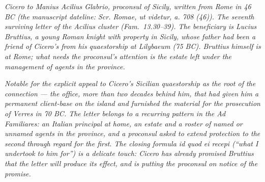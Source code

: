 
\textit{Cicero to Manius Acilius Glabrio, proconsul of
Sicily, written from Rome in 46 BC (the manuscript
dateline: \textit{Scr. Romae, ut videtur, a. 708 (46)}).
The seventh surviving letter of the Acilius cluster
(Fam.\ 13.30--39). The beneficiary is Lucius Bruttius, a
young Roman knight with property in Sicily, whose
father had been a friend of Cicero's from his
quaestorship at Lilybaeum (75 BC). Bruttius himself is
at Rome; what needs the proconsul's attention is the
estate left under the management of agents in the
province.}

\textit{Notable for the explicit appeal to Cicero's
Sicilian quaestorship as the root of the connection ---
the office, more than two decades behind him, that had
given him a permanent client-base on the island and
furnished the material for the prosecution of Verres in
70 BC. The letter belongs to a recurring pattern in the
\textit{Ad Familiares}: an Italian principal at home, an
estate and a roster of named or unnamed agents in the
province, and a proconsul asked to extend protection to
the second through regard for the first. The closing
formula \textit{id quod ei recepi} (``what I undertook
to him for'') is a delicate touch: Cicero has already
promised Bruttius that the letter will produce its
effect, and is putting the proconsul on notice of the
promise.}
